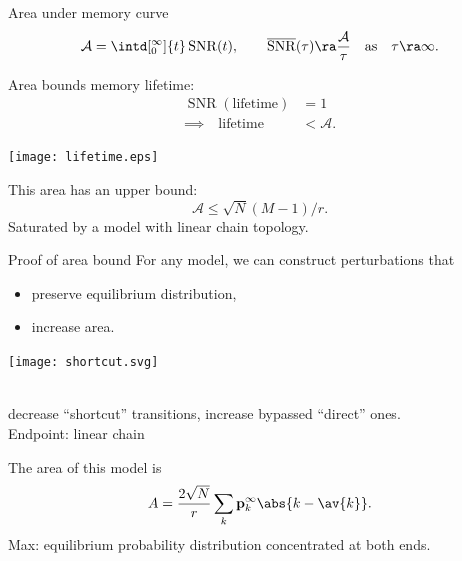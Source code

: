 \documentclass{beamer}%
\newcommand{\pr}{\mathbf{p}}
\newcommand{\eq}{\pr^\infty}
\DeclareMathOperator{\SNR}{SNR}
\DeclareMathOperator{\snr}{SNR}
\newcommand{\snrb}{\overline{\snr}}
\newcommand{\area}{\mathcal{A}}
\begin{document}

\begin{frame}{Area under memory curve}
%
  \begin{equation*}
    \area = \intd[_0^\infty]{t} \snr(t),
    \qquad
    \snrb(\tau) \ra \frac{\area}{\tau}
    \quad \text{as} \quad \tau \ra \infty.
  \end{equation*}
%


  \vp\parbox{5cm}{
  Area bounds memory lifetime:\\
  \begin{equation*}
  \begin{aligned}
    \SNR(\text{lifetime})&=1
    \\
    \implies
    \quad
    \text{lifetime} &< \area.
  \end{aligned}
  \end{equation*}
  }
  \parbox{6.5cm}{
    \texttt{[image: lifetime.eps]}
  }

  \vp This area has an upper bound:
  \begin{equation*}
    \area \leq \sqrt{N}(M-1)/r.
  \end{equation*}
  Saturated by a model with linear chain topology.
%
\end{frame}


\begin{frame}[label=fr_areaproof]{Proof of area bound}
%
 For any model, we can construct perturbations that
 \parbox[c]{5cm}{
  \begin{itemize}
    \item preserve equilibrium distribution,
    \item increase area.
  \end{itemize}
  \hyperlink{fr_tech}{}
 }
 \parbox[c]{5cm}{
  \begin{center}
    \texttt{[image: shortcut.svg]}
  \end{center}
 }\\
 \eg decrease ``shortcut'' transitions, increase bypassed ``direct'' ones.\\
 Endpoint: linear chain

 \vp The area of this model is
 \begin{equation*}
   A = \frac{2\sqrt{N}}{r}\sum_k \eq_k \abs{k-\av{k}}.
 \end{equation*}
 \note[item]{max given $\eq$}
 \note[item]{now max \wrt $\eq$}
 Max: equilibrium probability distribution concentrated at both ends.
 \\
%
\end{frame}
\end{document}
